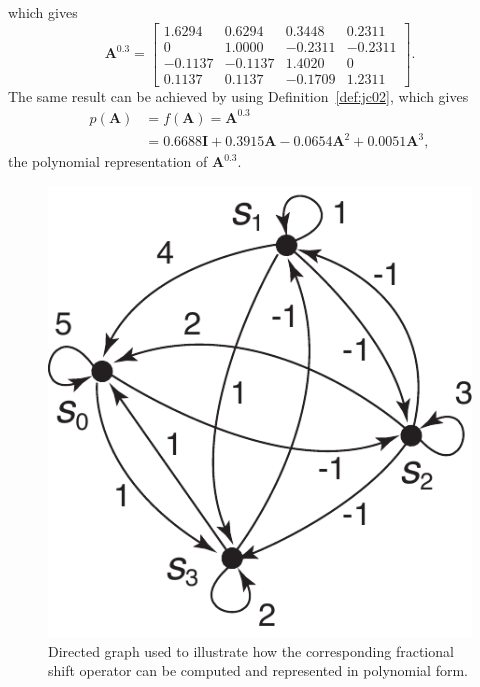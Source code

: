 which gives
\begin{equation}\nonumber
\mathbf{A}^{0.3}=
\left[\begin{array}{ccccc}
    1.6294  &  0.6294 &   0.3448 &   0.2311\\
         0  &  1.0000 &  -0.2311 &  -0.2311\\
   -0.1137 &  -0.1137  &  1.4020     &    0\\
    0.1137  &  0.1137  & -0.1709  &  1.2311
\end{array}\right].
\end{equation}
The same result can be achieved by using Definition~\ref{def:jc02}, which gives
\begin{align}
    p(\mathbf{A})&=f(\mathbf{A})=\mathbf{A}^{0.3}\nonumber\\
    &=0.6688\mathbf{I}+0.3915\mathbf{A}-0.0654\mathbf{A}^2+0.0051\mathbf{A}^3,\nonumber
\end{align}
the polynomial representation of $\mathbf{A}^{0.3}$.

\begin{figure}
	\centering
	\includegraphics[width=0.55\linewidth]{Figures/graph_jordan.pdf}
	\caption{Directed graph used to illustrate how the corresponding fractional shift operator can be computed and represented in polynomial form.}
	\label{fig:polyrepres}
\end{figure}

